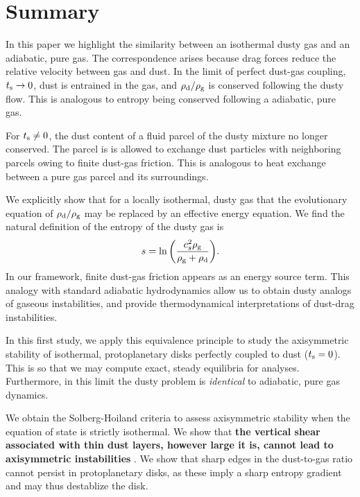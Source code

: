 \section{Summary}\label{summary}
In this paper we highlight the similarity between an isothermal 
dusty gas and an adiabatic, pure gas. The correspondence arises
because drag forces reduce the relative velocity between gas and
dust. In the limit of perfect dust-gas coupling, $t_\mathrm{s} \to 0$,  
 dust is entrained in 
the gas, and $\rho_\mathrm{d}/\rho_\mathrm{g}$ is conserved following the dusty flow. 
This is analogous to entropy being conserved following a adiabatic,
pure gas. 

For $t_\mathrm{s}\neq 0$, the dust content of a
fluid parcel of the dusty mixture no longer conserved. The parcel is
is allowed to exchange dust particles with neighboring parcels owing
to finite dust-gas friction. This is analogous to heat exchange between a 
pure gas parcel and its surroundings. %

We explicitly show that for a locally isothermal, dusty gas that the
evolutionary equation of  $\rho_\mathrm{d}/\rho_\mathrm{g}$ may be replaced by an 
effective energy equation. We find the 
natural definition of the entropy of the dusty gas is 
\begin{align*}
  s  = \ln{\left(\frac{c_s^2\rho_\mathrm{g}}{\rho_\mathrm{g}+\rho_\mathrm{d}}\right)}.  
\end{align*}
In our framework, finite dust-gas friction appears as an energy
source term.  This analogy with standard adiabatic
hydrodynamics allow us to obtain dusty analogs of gaseous
instabilities, and provide thermodynamical interpretations of  
dust-drag instabilities. 

%
In this first study, we apply this equivalence principle to study the
axisymmetric stability of isothermal, protoplanetary disks
perfectly coupled to dust ($t_\mathrm{s}=0$). This is so that we may 
compute exact, steady equilibria for analyses. Furthermore, 
in this limit the dusty problem is \emph{identical} to adiabatic, pure
gas dynamics. 

We obtain the Solberg-Hoiland criteria to assess 
axisymmetric stability when the equation of state is strictly
isothermal. We show that {\bf the vertical shear associated with thin dust
 layers, however large it is, cannot lead to axisymmetric
  instabilities} \citep[cf. \emph{non-axisymmetric} Kelvin-Helmholtz instabilities
  in dusty disks, ][]{lee10}. We show that
sharp edges in the dust-to-gas ratio cannot persist in protoplanetary
disks, as these imply a sharp entropy gradient and may thus destablize
the disk. 

